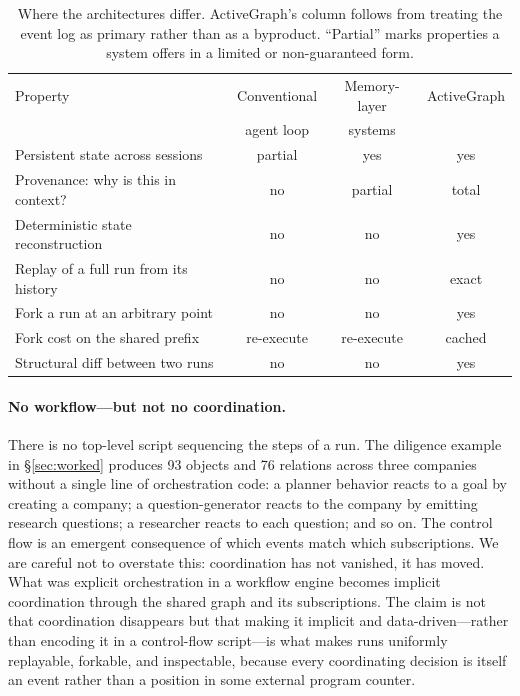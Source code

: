 \documentclass[11pt]{article}
\begin{document}
\begin{table}[ht]
\centering
\small
\caption{Where the architectures differ. ActiveGraph's column follows from treating
the event log as primary rather than as a byproduct. ``Partial'' marks properties
a system offers in a limited or non-guaranteed form.}
\label{tab:compare}
\begin{tabular}{lccc}
\toprule
Property & Conventional & Memory-layer & ActiveGraph \\
 & agent loop & systems & \\
\midrule
Persistent state across sessions & partial & yes & yes \\
Provenance: why is this in context? & no & partial & total \\
Deterministic state reconstruction & no & no & yes \\
Replay of a full run from its history & no & no & exact \\
Fork a run at an arbitrary point & no & no & yes \\
Fork cost on the shared prefix & re-execute & re-execute & cached \\
Structural diff between two runs & no & no & yes \\
\bottomrule
\end{tabular}
\end{table}

\paragraph{No workflow---but not no coordination.}
There is no top-level script sequencing the steps of a run. The diligence example
in \S\ref{sec:worked} produces 93 objects and 76 relations across three companies
without a single line of orchestration code: a planner behavior reacts to a goal
by creating a company; a question-generator reacts to the company by emitting
research questions; a researcher reacts to each question; and so on. The control
flow is an emergent consequence of which events match which subscriptions. We are
careful not to overstate this: coordination has not vanished, it has moved. What
was explicit orchestration in a workflow engine becomes implicit coordination
through the shared graph and its subscriptions. The claim is not that coordination
disappears but that making it implicit and data-driven---rather than encoding it
in a control-flow script---is what makes runs uniformly replayable, forkable, and
inspectable, because every coordinating decision is itself an event rather than a
position in some external program counter.
\end{document}

